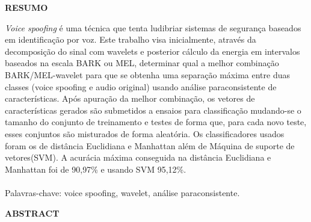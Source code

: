 \setlength{\parindent}{0pt}
\newpage \thispagestyle{empty}
\vspace{1.5cm}
\fontsize{12}{\baselineskip} \selectfont

\begin{center}
	{\huge{\textbf{RESUMO}}}
\end{center}

\begin{myenv}{1.5}
	\fontsize{12}{\baselineskip} \selectfont \onehalfspacing
	\par \null
	\par \null
	\par \textit{Voice spoofing} é uma técnica que tenta ludibriar sistemas de segurança baseados em identificação por voz. Este trabalho visa inicialmente, através da decomposição do sinal com wavelets e posterior cálculo da energia em intervalos baseados na escala BARK ou MEL, determinar qual a melhor combinação BARK/MEL-wavelet para que se obtenha uma separação máxima entre duas classes (voice spoofing e audio original) usando análise paraconsistente de características. Após apuração da melhor combinação, os vetores de características gerados são submetidos a ensaios para classificação mudando-se o tamanho do conjunto de treinamento e testes de forma que, para cada novo teste, esses conjuntos são misturados de forma aleatória. Os classificadores usados foram os de distância Euclidiana e Manhattan além de Máquina de suporte de vetores(SVM). A acurácia máxima conseguida na distância Euclidiana e Manhattan foi de 90,97\% e usando SVM 95,12\%.\\\\
	Palavras-chave: voice spoofing, wavelet, análise paraconsistente.
\end{myenv}

\setlength{\parindent}{0pt}
\newpage \thispagestyle{empty}
\vspace{1.5cm}
\fontsize{12}{\baselineskip} \selectfont
\begin{center}
	{\huge{\textbf{ABSTRACT}}}
\end{center}

